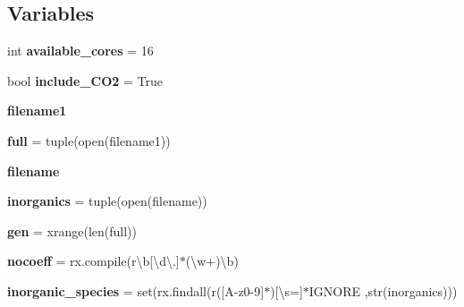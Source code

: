 \subsection*{Variables}
\begin{DoxyCompactItemize}
\item 
\mbox{\label{namespaceMCM__subset_a9df50dc647ca2746e52b9a516c3073dc}} 
int {\bfseries available\+\_\+cores} = 16
\item 
\mbox{\label{namespaceMCM__subset_a893f888de3ba337a3874acf9df8fa873}} 
bool {\bfseries include\+\_\+\+C\+O2} = True
\item 
\mbox{\label{namespaceMCM__subset_acdc7ae482446894e3346ed0aa4fddfaa}} 
{\bfseries filename1}
\item 
\mbox{\label{namespaceMCM__subset_a2e8d1087089225cc53c89c15470643e3}} 
{\bfseries full} = tuple(open(filename1))
\item 
\mbox{\label{namespaceMCM__subset_a12f291689a3726c5ffed99e21265962f}} 
{\bfseries filename}
\item 
\mbox{\label{namespaceMCM__subset_a754521b15c8923d2bcde8613d72c6335}} 
{\bfseries inorganics} = tuple(open(filename))
\item 
\mbox{\label{namespaceMCM__subset_a268e680cfa37f137fee0efc751c8093f}} 
{\bfseries gen} = xrange(len(full))
\item 
\mbox{\label{namespaceMCM__subset_ac4cfa9c0deab5210533157c4ed94197a}} 
{\bfseries nocoeff} = rx.\+compile(r\textquotesingle{}\textbackslash{}b\mbox{[}\textbackslash{}d\textbackslash{}.\mbox{]}$\ast$(\textbackslash{}w+)\textbackslash{}b\textquotesingle{})
\item 
\mbox{\label{namespaceMCM__subset_af7fbdb07ba01cebc947dc229dedda6e3}} 
{\bfseries inorganic\+\_\+species} = set(rx.\+findall(r\textquotesingle{}(\mbox{[}A-\/z0-\/9\mbox{]}$\ast$)\mbox{[}\textbackslash{}s=\mbox{]}$\ast$I\+G\+N\+O\+RE\textquotesingle{} ,str(inorganics)))
\item 

\end{DoxyCompactItemize}
